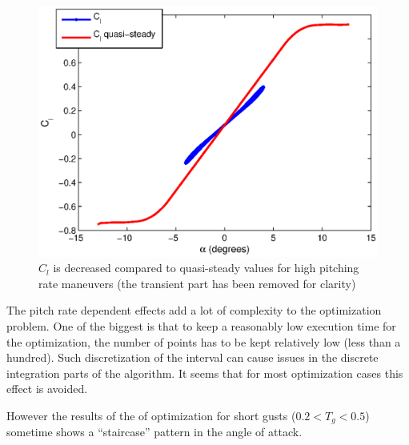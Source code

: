 \begin{figure}[h]
  \centering
  \includegraphics{./Figures/Cl_vs_alpha_amp=4_k=0p5.eps}
  \caption{$C_l$ is decreased compared to quasi-steady values for high pitching rate maneuvers (the transient part has been removed for clarity)}
  \label{fig:Cl_fast_pitching}
\end{figure}

\FloatBarrier
 \label{sub:staircase}
The pitch rate dependent effects add a lot of complexity to the optimization problem.
One of the biggest is that to keep a reasonably low execution time for the optimization, the number of points has to be kept relatively low (less than a hundred).
Such discretization of the interval can cause issues in the discrete integration parts of the algorithm.
It seems that for most optimization cases this effect is avoided.

\par However the results of the of optimization for short gusts ($0.2<T_g<0.5$) sometime shows a ``staircase'' pattern in the angle of attack.

